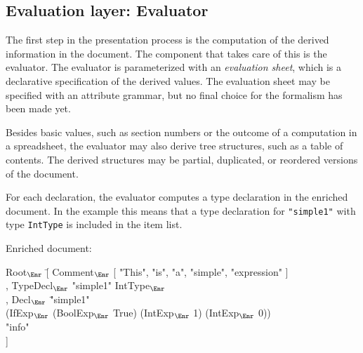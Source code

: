 \begin{center}
\end{center}

%																
\subsection{Evaluation layer: Evaluator} \label{sect:evaluator}

The first step in the presentation process is the computation of the derived information in the document. The component that takes care of this is the evaluator. The evaluator is parameterized with an {\em evaluation sheet}, which is a declarative specification of the derived values. The evaluation sheet may be specified with an attribute grammar, but no final choice for the formalism has been made yet.

Besides basic values, such as section numbers or the outcome of a computation in a spreadsheet, the evaluator may also derive tree structures, such as a table of contents. The derived structures may be partial, duplicated, or reordered versions of the document.

 For each declaration, the evaluator computes a type declaration in the enriched document. In the example this means that a type declaration for \verb|"simple1"| with type {\tt IntType} is included in the item list.

Enriched document:
\small \ttfamily
\begin{tabbing}
Root$_{\Enr}$ \= [ Comment$_{\Enr}$ [ "This", "is", "a", "simple", "expression" ]\\
       \> , TypeDecl$_{\Enr}$ "simple1" IntType$_{\Enr}$\\
       \> , Decl$_{\Enr}$ \= "simple1"\\
       \>                       \> (IfExp$_{\Enr}$ (BoolExp$_{\Enr}$ True) (IntExp$_{\Enr}$ 1) (IntExp$_{\Enr}$ 0)) \\
       \>                        \> "info"\\
       \> ] 
\end{tabbing}
\rmfamily \normalsize


